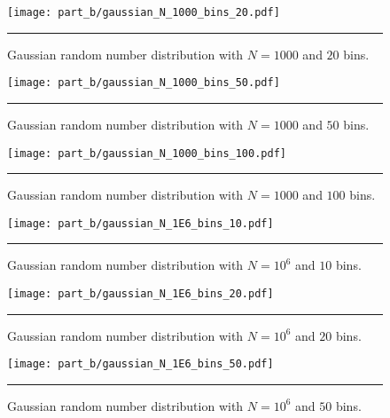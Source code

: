 \documentclass[notitlepage,aps,prd,nofootinbib]{revtex4-1}
\begin{document}
\begin{figure}[!htbc]
  \centering
  \texttt{[image: part\_b/gaussian\_N\_1000\_bins\_20.pdf]}
	{\par\nobreak\rule[9pt]{35em}{0.5pt}\vspace{-5mm}}
	\caption{Gaussian random number distribution with $N = 1000$ and $20$ bins.}
	\label{fig:gaussian_N_1000_bins_20}
\end{figure}

\begin{figure}[!htbc]
  \centering
  \texttt{[image: part\_b/gaussian\_N\_1000\_bins\_50.pdf]}
	{\par\nobreak\rule[9pt]{35em}{0.5pt}\vspace{-5mm}}
	\caption{Gaussian random number distribution with $N = 1000$ and $50$ bins.}
	\label{fig:gaussian_N_1000_bins_50}
\end{figure}

\begin{figure}[!htbc]
  \centering
  \texttt{[image: part\_b/gaussian\_N\_1000\_bins\_100.pdf]}
	{\par\nobreak\rule[9pt]{35em}{0.5pt}\vspace{-5mm}}
	\caption{Gaussian random number distribution with $N = 1000$ and $100$ bins.}
	\label{fig:gaussian_N_1000_bins_100}
\end{figure}

\clearpage

\begin{figure}[!htbc]
  \centering
  \texttt{[image: part\_b/gaussian\_N\_1E6\_bins\_10.pdf]}
	{\par\nobreak\rule[9pt]{35em}{0.5pt}\vspace{-5mm}}
	\caption{Gaussian random number distribution with $N = 10^6$ and $10$ bins.}
	\label{fig:gaussian_N_1E6_bins_10}
\end{figure}

\begin{figure}[!htbc]
  \centering
  \texttt{[image: part\_b/gaussian\_N\_1E6\_bins\_20.pdf]}
	{\par\nobreak\rule[9pt]{35em}{0.5pt}\vspace{-5mm}}
	\caption{Gaussian random number distribution with $N = 10^6$ and $20$ bins.}
	\label{fig:gaussian_N_1E6_bins_20}
\end{figure}

\begin{figure}[!htbc]
  \centering
  \texttt{[image: part\_b/gaussian\_N\_1E6\_bins\_50.pdf]}
	{\par\nobreak\rule[9pt]{35em}{0.5pt}\vspace{-5mm}}
	\caption{Gaussian random number distribution with $N = 10^6$ and $50$ bins.}
	\label{fig:gaussian_N_1E6_bins_50}
\end{figure}
\end{document}
